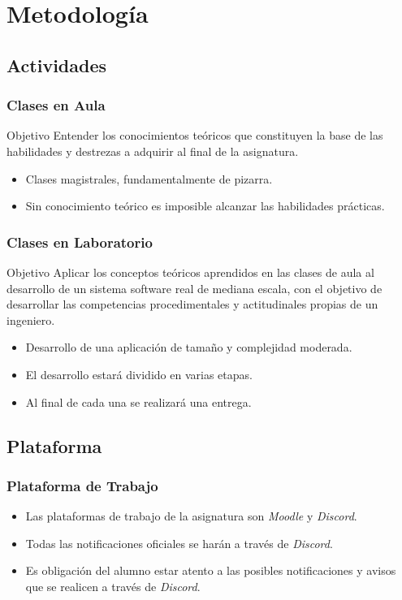 \documentclass[handout,a4paper,t,xcolor=pst,colortheme]{beamer}
\begin{document}
\section{Metodología}

\subsection{Actividades}

\begin{frame}[c]
	\frametitle{Clases en Aula}
	\begin{block}{Objetivo}
		Entender los conocimientos teóricos que constituyen la base de las habilidades y destrezas a adquirir al final de la asignatura.
	\end{block}
	\begin{itemize}
		\item<2-> Clases magistrales, fundamentalmente de pizarra.
		\item<3-> Sin conocimiento teórico es imposible alcanzar las habilidades prácticas.
	\end{itemize}
\end{frame}

\begin{frame}[c]
	\frametitle{Clases en Laboratorio}
	\begin{block}{Objetivo}
		Aplicar los conceptos teóricos aprendidos en las clases de aula al desarrollo de un sistema software real de mediana escala, con el objetivo de desarrollar las competencias procedimentales y actitudinales propias de un ingeniero.
	\end{block}
	\begin{itemize}
		\item<2-> Desarrollo de una aplicación de tamaño y complejidad moderada.
		\item<3-> El desarrollo estará dividido en varias etapas. 
		\item<4-> Al final de cada una se realizará una entrega.
	\end{itemize}
\end{frame}

\subsection{Plataforma}

\begin{frame}[c]
	\frametitle{Plataforma de Trabajo}
	\begin{itemize}
		\item<1-> Las plataformas de trabajo de la asignatura son \emph{Moodle} y \emph{Discord}.
		\item<2-> Todas las notificaciones oficiales se harán a través de \emph{Discord}.
		\item<3-> Es obligación del alumno estar atento a las posibles notificaciones y avisos que se realicen a través de \emph{Discord}.
	\end{itemize}
\end{frame}
\end{document}
